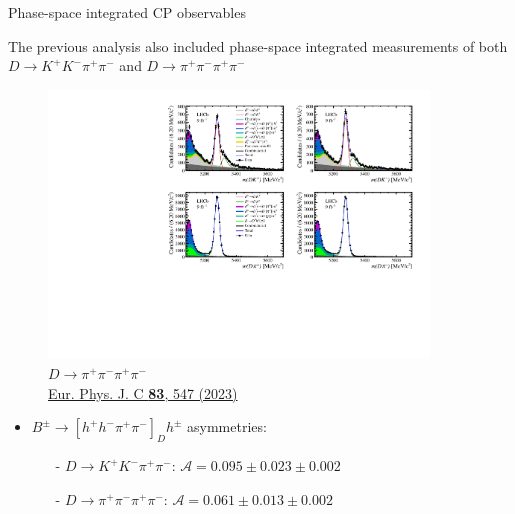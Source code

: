 \documentclass[xcolor={dvipsnames}]{beamer}
\begin{document}
\begin{frame}{Phase-space integrated CP observables}
  \begin{center}
    {\large The previous analysis also included phase-space integrated measurements of both $D\to K^+K^-\pi^+\pi^-$ and $D\to\pi^+\pi^-\pi^+\pi^-$}
  \end{center}
  \begin{figure}
    \centering
    \includegraphics[width = 0.9\textwidth,trim={0 7cm 0 0},clip=true]{Plots/d2pipipipi_fiveL_allDP_GLW.pdf}
    \caption*{$D\to\pi^+\pi^-\pi^+\pi^-$\\ \tiny\href{https://link.springer.com/article/10.1140/epjc/s10052-023-11560-5}{Eur. Phys. J. C \textbf{83}, 547 (2023)}}
  \end{figure}
  \vspace{-0.5cm}
  \begin{itemize}
    \item{$B^\pm\to[h^+h^-\pi^+\pi^-]_Dh^\pm$ asymmetries:}
    \begin{itemize}
      \item[-]{$D\to K^+K^-\pi^+\pi^-$: $\mathcal{A} = 0.095 \pm 0.023 \pm 0.002$}
      \item[-]{$D\to\pi^+\pi^-\pi^+\pi^-$: $\mathcal{A} = 0.061 \pm 0.013 \pm 0.002$}
    \end{itemize}
  \end{itemize}
\end{frame}
\end{document}
